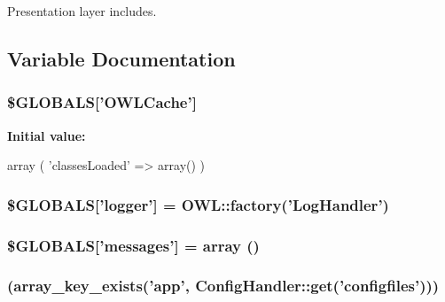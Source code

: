 Presentation layer includes. 



\subsection{Variable Documentation}
\subsubsection[{\$GLOBALS}]{\setlength{\rightskip}{0pt plus 5cm}\$GLOBALS\mbox{[}'OWLCache'\mbox{]}}\label{OWLloader_8php_a79190ec221c2b52403f7324f1d224c8f}
{\bfseries Initial value:}
\begin{DoxyCode}
 array (
         'classesLoaded' => array()
)
\end{DoxyCode}
\subsubsection[{\$GLOBALS}]{\setlength{\rightskip}{0pt plus 5cm}\$GLOBALS\mbox{[}'logger'\mbox{]} = OWL::factory('{\bf LogHandler}')}\label{OWLloader_8php_ad8f7743ae327face727dae55887c2a43}
\subsubsection[{\$GLOBALS}]{\setlength{\rightskip}{0pt plus 5cm}\$GLOBALS\mbox{[}'messages'\mbox{]} = array ()}\label{OWLloader_8php_a65f2996116eed36e9ab25f254a470259}
\subsubsection[{if}]{(array\_\-key\_\-exists('app', ConfigHandler::get('configfiles')))}\label{OWLloader_8php_a78407183564d6b92f2219d8a10b9349c}
